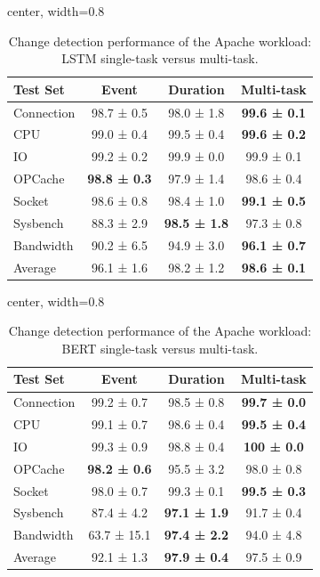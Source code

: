 \documentclass[preprint,12pt]{elsarticle}
\begin{document}
\begin{table}[tb]
\centering
\caption{Change detection performance of the Apache workload: LSTM single-task versus multi-task.}
\label{tab:lstm}
\begin{adjustbox}{center, width=0.8\textwidth}
\begin{tabular}{|l|c|c|c|}
\hline
Test Set & Event & Duration & Multi-task \\ \hline
Connection      & 98.7 ± 0.5            & 98.0 ± 1.8 & \textbf{99.6 ± 0.1} \\
CPU             & 99.0 ± 0.4            & 99.5 ± 0.4 & \textbf{99.6 ± 0.2} \\
IO              & 99.2 ± 0.2            & 99.9 ± 0.0 & 99.9 ± 0.1 \\
OPCache         & \textbf{98.8 ± 0.3}   & 97.9 ± 1.4 & 98.6 ± 0.4 \\
Socket          & 98.6 ± 0.8            & 98.4 ± 1.0 & \textbf{99.1 ± 0.5}  \\
Sysbench        & 88.3 ± 2.9            & \textbf{98.5 ± 1.8} & 97.3 ± 0.8  \\
Bandwidth       & 90.2 ± 6.5            & 94.9 ± 3.0 & \textbf{96.1 ± 0.7} \\ \hline
Average         & 96.1 ± 1.6            & 98.2 ± 1.2 & \textbf{98.6 ± 0.1} \\ \hline
\end{tabular}
\end{adjustbox}
\end{table}


\begin{table}[tb]
\centering
\caption{Change detection performance of the Apache workload: BERT single-task versus multi-task.}
\label{tab:transformer}
\begin{adjustbox}{center, width=0.8\textwidth}
\begin{tabular}{|l|c|c|c|}
\hline
Test Set  & Event & Duration & Multi-task \\ \hline
Connection & 99.2 ± 0.7 & 98.5 ± 0.8 & \textbf{99.7 ± 0.0} \\
CPU        & 99.1 ± 0.7 & 98.6 ± 0.4 & \textbf{99.5 ± 0.4} \\
IO         & 99.3 ± 0.9 & 98.8 ± 0.4 & \textbf{100 ± 0.0} \\
OPCache    & \textbf{98.2 ± 0.6} & 95.5 ± 3.2 & 98.0 ± 0.8 \\
Socket     & 98.0 ± 0.7 & 99.3 ± 0.1 & \textbf{99.5 ± 0.3}\\
Sysbench   & 87.4 ± 4.2 & \textbf{97.1 ± 1.9} & 91.7 ± 0.4 \\
Bandwidth  & 63.7 ± 15.1& \textbf{97.4 ± 2.2} & 94.0 ± 4.8 \\ \hline
Average         & 92.1 ± 1.3 & \textbf{97.9 ± 0.4} & 97.5 ± 0.9 \\ \hline
\end{tabular}
\end{adjustbox}
\end{table}
\end{document}
